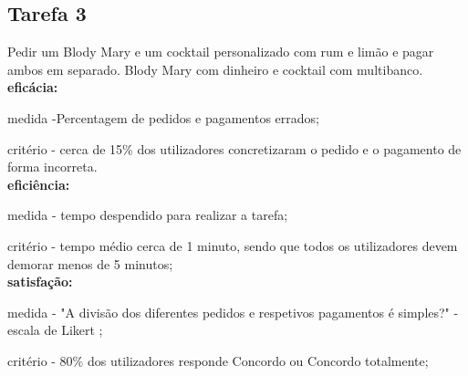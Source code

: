 \documentclass{article}
\begin{document}
\subsection*{Tarefa 3}
Pedir um Blody Mary e um cocktail personalizado com rum e limão e pagar ambos em separado.
Blody Mary com dinheiro e cocktail com multibanco.\\
\textbf{eficácia:}

medida -Percentagem de pedidos e pagamentos errados;

critério - cerca de 15\% dos utilizadores concretizaram o pedido e o pagamento de forma incorreta.
\\
\textbf{eficiência:} 

medida - tempo despendido para realizar a tarefa;

critério - tempo médio cerca de 1 minuto, sendo que todos os utilizadores devem demorar menos de 5 minutos;\\
\textbf{satisfação:}

medida - "A divisão dos diferentes pedidos e respetivos pagamentos é simples?" - escala de Likert ;

critério - 80\% dos utilizadores responde Concordo ou Concordo totalmente;
\end{document}
